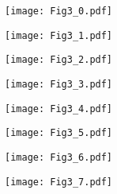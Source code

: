 \documentclass[12pt]{article}
\begin{document}
 

\begin{figure}
\begin{minipage}{8cm} 
\texttt{[image: Fig3\_0.pdf]}
\end{minipage}
\hfill
\begin{minipage}{9cm} 
\hspace{0.2cm}
\hfill
\begin{minipage}{8cm} 
\texttt{[image: Fig3\_1.pdf]}
\end{minipage}
\end{minipage}
\vfill
\begin{minipage}{8cm} 
\texttt{[image: Fig3\_2.pdf]}
\end{minipage}
\hfill
\begin{minipage}{9cm} 
\hspace{0.2cm}
\hfill
\begin{minipage}{8cm} 
\texttt{[image: Fig3\_3.pdf]}
\end{minipage}
\end{minipage}
\vfill
\begin{minipage}{8cm} 
\texttt{[image: Fig3\_4.pdf]}
\end{minipage}
\hfill
\begin{minipage}{9cm} 
\hspace{0.2cm}
\hfill
\begin{minipage}{8cm} 
\texttt{[image: Fig3\_5.pdf]}
\end{minipage}
\end{minipage}
\vfill
\begin{minipage}{8cm} 
\texttt{[image: Fig3\_6.pdf]}
\end{minipage}
\hfill
\begin{minipage}{9cm} 
\hspace{0.2cm}
\hfill
\begin{minipage}{8cm} 
\texttt{[image: Fig3\_7.pdf]}
\end{minipage}
\end{minipage}

\end{figure}
\end{document}
